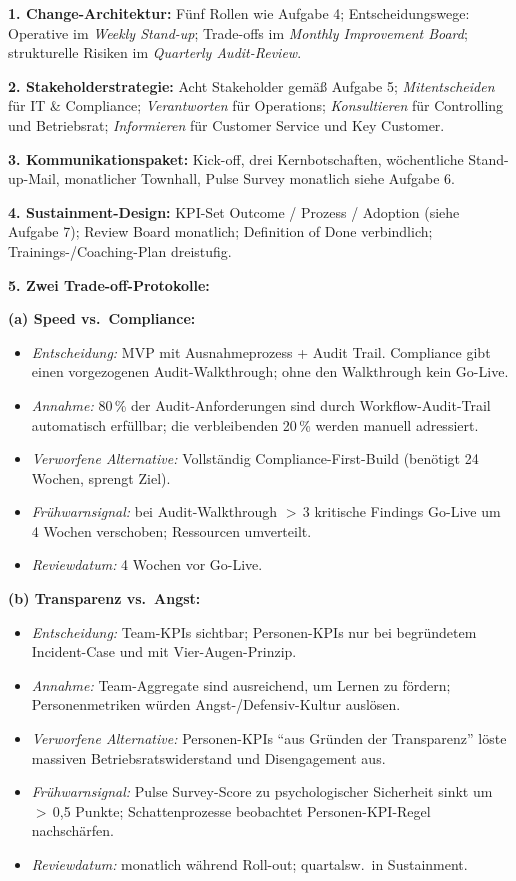 \documentclass[11pt,a4paper,oneside]{article}
\begin{document}
\begin{loesungbox}
\textbf{1. Change-Architektur:} F\"unf Rollen wie Aufgabe 4; Entscheidungswege: Operative im \emph{Weekly Stand-up}; Trade-offs im \emph{Monthly Improvement Board}; strukturelle Risiken im \emph{Quarterly Audit-Review}.

\smallskip
\textbf{2. Stakeholderstrategie:} Acht Stakeholder gem\"a{\ss} Aufgabe 5; \emph{Mitentscheiden} f\"ur IT \& Compliance; \emph{Verantworten} f\"ur Operations; \emph{Konsultieren} f\"ur Controlling und Betriebsrat; \emph{Informieren} f\"ur Customer Service und Key Customer.

\smallskip
\textbf{3. Kommunikationspaket:} Kick-off, drei Kernbotschaften, w\"ochentliche Stand-up-Mail, monatlicher Townhall, Pulse Survey monatlich \textendash{} siehe Aufgabe 6.

\smallskip
\textbf{4. Sustainment-Design:} KPI-Set Outcome / Prozess / Adoption (siehe Aufgabe 7); Review Board monatlich; Definition of Done verbindlich; Trainings-/Coaching-Plan dreistufig.

\smallskip
\textbf{5. Zwei Trade-off-Protokolle:}

\smallskip
\textbf{(a) Speed vs.\ Compliance:}
\begin{itemize}
  \item \emph{Entscheidung:} MVP mit Ausnahmeprozess + Audit Trail. Compliance gibt einen vorgezogenen Audit-Walkthrough; ohne den Walkthrough kein Go-Live.
  \item \emph{Annahme:} 80\,\% der Audit-Anforderungen sind durch Workflow-Audit-Trail automatisch erf\"ullbar; die verbleibenden 20\,\% werden manuell adressiert.
  \item \emph{Verworfene Alternative:} Vollst\"andig Compliance-First-Build (ben\"otigt 24 Wochen, sprengt Ziel).
  \item \emph{Fr\"uhwarnsignal:} bei Audit-Walkthrough $>$\,3 kritische Findings \textrightarrow{} Go-Live um 4 Wochen verschoben; Ressourcen umverteilt.
  \item \emph{Reviewdatum:} 4 Wochen vor Go-Live.
\end{itemize}

\smallskip
\textbf{(b) Transparenz vs.\ Angst:}
\begin{itemize}
  \item \emph{Entscheidung:} Team-KPIs sichtbar; Personen-KPIs nur bei begr\"undetem Incident-Case und mit Vier-Augen-Prinzip.
  \item \emph{Annahme:} Team-Aggregate sind ausreichend, um Lernen zu f\"ordern; Personenmetriken w\"urden Angst-/Defensiv-Kultur ausl\"osen.
  \item \emph{Verworfene Alternative:} Personen-KPIs ``aus Gr\"unden der Transparenz'' \textendash{} l\"oste massiven Betriebsratswiderstand und Disengagement aus.
  \item \emph{Fr\"uhwarnsignal:} Pulse Survey-Score zu psychologischer Sicherheit sinkt um $>$\,0,5 Punkte; Schattenprozesse beobachtet \textrightarrow{} Personen-KPI-Regel nachsch\"arfen.
  \item \emph{Reviewdatum:} monatlich w\"ahrend Roll-out; quartalsw.\ in Sustainment.
\end{itemize}
\end{loesungbox}
\end{document}
